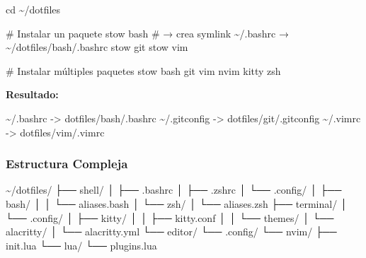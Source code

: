 \documentclass[
  doc,
  floatsintext,
  longtable,
  a4paper,
  nolmodern,
  notxfonts,
  notimes,
  12pt,
  colorlinks=true,linkcolor=blue,citecolor=blue,urlcolor=blue]{apa7}
\newenvironment{Shaded}{\begin{snugshade}}{\end{snugshade}}
\newcommand{\AttributeTok}[1]{\textcolor[rgb]{0.40,0.45,0.13}{#1}}
\newcommand{\BuiltInTok}[1]{\textcolor[rgb]{0.00,0.23,0.31}{#1}}
\newcommand{\CommentTok}[1]{\textcolor[rgb]{0.37,0.37,0.37}{#1}}
\newcommand{\ExtensionTok}[1]{\textcolor[rgb]{0.00,0.23,0.31}{#1}}
\newcommand{\NormalTok}[1]{\textcolor[rgb]{0.00,0.23,0.31}{#1}}
\newcommand{\OperatorTok}[1]{\textcolor[rgb]{0.37,0.37,0.37}{#1}}
\begin{document}
\begin{Shaded}
\begin{Highlighting}[]
\BuiltInTok{cd}\NormalTok{ \textasciitilde{}/dotfiles}

\CommentTok{\# Instalar un paquete}
\ExtensionTok{stow}\NormalTok{ bash       }\CommentTok{\# → crea symlink \textasciitilde{}/.bashrc → \textasciitilde{}/dotfiles/bash/.bashrc}
\ExtensionTok{stow}\NormalTok{ git}
\ExtensionTok{stow}\NormalTok{ vim}

\CommentTok{\# Instalar múltiples paquetes}
\ExtensionTok{stow}\NormalTok{ bash git vim nvim kitty zsh}
\end{Highlighting}
\end{Shaded}

\textbf{Resultado:}

\begin{Shaded}
\begin{Highlighting}[]
\ExtensionTok{\textasciitilde{}/.bashrc} \AttributeTok{{-}}\OperatorTok{\textgreater{}}\NormalTok{ dotfiles/bash/.bashrc}
\ExtensionTok{\textasciitilde{}/.gitconfig} \AttributeTok{{-}}\OperatorTok{\textgreater{}}\NormalTok{ dotfiles/git/.gitconfig}
\ExtensionTok{\textasciitilde{}/.vimrc} \AttributeTok{{-}}\OperatorTok{\textgreater{}}\NormalTok{ dotfiles/vim/.vimrc}
\end{Highlighting}
\end{Shaded}

\subsubsection{Estructura Compleja}\label{estructura-compleja}

\begin{Shaded}
\begin{Highlighting}[]
\ExtensionTok{\textasciitilde{}/dotfiles/}
\ExtensionTok{├──}\NormalTok{ shell/}
\ExtensionTok{│}\NormalTok{   ├── .bashrc}
\ExtensionTok{│}\NormalTok{   ├── .zshrc}
\ExtensionTok{│}\NormalTok{   └── .config/}
\ExtensionTok{│}\NormalTok{       ├── bash/}
\ExtensionTok{│}\NormalTok{       │   └── aliases.bash}
\ExtensionTok{│}\NormalTok{       └── zsh/}
\ExtensionTok{│}\NormalTok{           └── aliases.zsh}
\ExtensionTok{├──}\NormalTok{ terminal/}
\ExtensionTok{│}\NormalTok{   └── .config/}
\ExtensionTok{│}\NormalTok{       ├── kitty/}
\ExtensionTok{│}\NormalTok{       │   ├── kitty.conf}
\ExtensionTok{│}\NormalTok{       │   └── themes/}
\ExtensionTok{│}\NormalTok{       └── alacritty/}
\ExtensionTok{│}\NormalTok{           └── alacritty.yml}
\ExtensionTok{└──}\NormalTok{ editor/}
    \ExtensionTok{└──}\NormalTok{ .config/}
        \ExtensionTok{└──}\NormalTok{ nvim/}
            \ExtensionTok{├──}\NormalTok{ init.lua}
            \ExtensionTok{└──}\NormalTok{ lua/}
                \ExtensionTok{└──}\NormalTok{ plugins.lua}
\end{Highlighting}
\end{Shaded}
\end{document}
